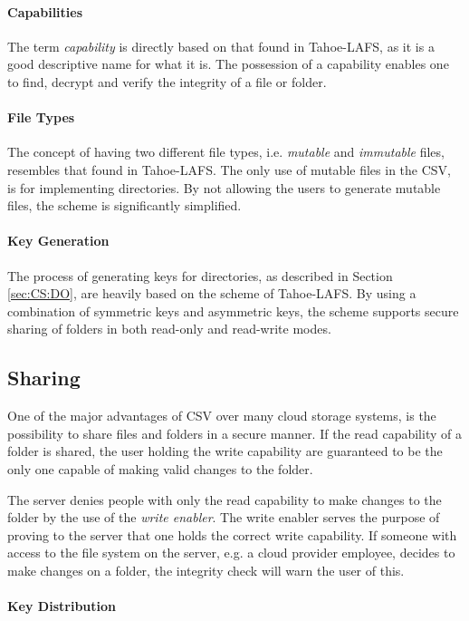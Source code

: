 \documentclass[pdftex,english,10pt,b5paper,twoside]{book}
\begin{document}
\paragraph{Capabilities} The term \emph{capability} is directly based on that
found in Tahoe-\ac{LAFS}, as it is a good descriptive name for what it is. The
possession of a capability enables one to find, decrypt and verify the
integrity of a file or folder.

\paragraph{File Types} The concept of having two different file types, i.e.
\emph{mutable} and \emph{immutable} files, resembles that found in
Tahoe-\ac{LAFS}. The only use of mutable files in the \acl{CSV}, is for
implementing directories. By not allowing the users to generate mutable files,
the scheme is significantly simplified.

\paragraph{Key Generation} The process of generating keys for directories, as
described in Section \ref{sec:CS:DO}, are heavily based on the scheme of
Tahoe-\ac{LAFS}. By using a combination of symmetric keys and asymmetric keys,
the scheme supports secure sharing of folders in both read-only and read-write
modes.

\subsection{Sharing}

One of the major advantages of \ac{CSV} over many cloud storage systems, is the
possibility to share files and folders in a secure manner. If the read
capability of a folder is shared, the user holding the write capability are
guaranteed to be the only one capable of making valid changes to the folder.

The server denies people with only the read capability to make changes to the
folder by the use of the \emph{write enabler}. The write enabler serves the
purpose of proving to the server that one holds the correct write capability.
If someone with access to the file system on the server, e.g. a cloud
provider employee, decides to make changes on a folder, the integrity check
will warn the user of this.

\paragraph{Key Distribution}
\label{sec:DI:keydist}
\end{document}
